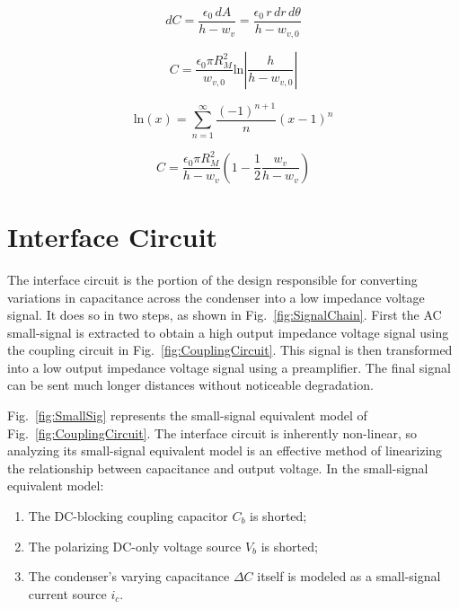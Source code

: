 \documentclass[journal]{IEEEtran}
\begin{document}
\begin{figure}[ht]
	\begin{equation}
		dC = \frac{\epsilon_0\,dA}{h-w_v} = \frac{\epsilon_0\,r\,dr\,d\theta}{h-w_{v,0}}
		\label{eq:DifferentialCapacitance}
	\end{equation}

	\begin{equation}
		C = \frac{\epsilon_0\pi R_M^2}{w_{v,0}} \mathrm{ln}\left|\frac{h}{h-w_{v,0}}\right|
		\label{eq:Capacitance}
	\end{equation}

	\begin{equation}
		\mathrm{ln}(x) = \sum_{n=1}^{\infty}\frac{(-1)^{n+1}}{n}(x-1)^n
		\label{eq:SeriesLn}
	\end{equation}

	\begin{equation}
		C = \frac{\epsilon_0\pi R_M^2}{h-w_v} \left( 1 - \frac{1}{2}\frac{w_v}{h-w_v} \right)
		\label{eq:SeriesCapacitance}
	\end{equation}
\end{figure}

\section{Interface Circuit}

The interface circuit is the portion of the design responsible for converting variations in capacitance across the condenser into a low impedance voltage signal. It does so in two steps, as shown in Fig.~\ref{fig:SignalChain}. First the AC small-signal is extracted to obtain a high output impedance voltage signal using the coupling circuit in Fig.~\ref{fig:CouplingCircuit}. This signal is then transformed into a low output impedance voltage signal using a preamplifier. The final signal can be sent much longer distances without noticeable degradation.\supercite{bruel}

Fig.~\ref{fig:SmallSig} represents the small-signal equivalent model of Fig.~\ref{fig:CouplingCircuit}. The interface circuit is inherently non-linear, so analyzing its small-signal equivalent model is an effective method of linearizing the relationship between capacitance and output voltage. In the small-signal equivalent model:

\begin{enumerate}
	\item The DC-blocking coupling capacitor $C_b$ is shorted; 
	\item The polarizing DC-only voltage source $V_b$ is shorted;
	\item The condenser's varying capacitance $\Delta C$ itself is modeled as a small-signal current source $i_c$.
\end{enumerate}
\end{document}

